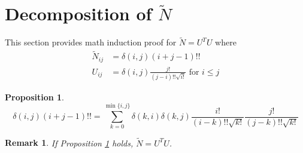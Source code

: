 \documentclass{article}
\newtheorem{remark}{Remark}
\newtheorem{proposition}{Proposition}
\begin{document}
\section{Decomposition of $\widetilde{N}$}
This section provides math induction proof for $\widetilde{N}= U^T U$ where
\begin{align}
\widetilde{N}_{ij} & = \delta(i, j) (i+j-1)!! \\
U_{ij} & = \delta(i, j) \frac{j!}{(j-i)!!\sqrt{i!}} \textrm{ for } i\leq j
\end{align}
\begin{proposition}\label{prop:UUN}
\begin{equation}
\delta(i, j) (i+j-1)!! = \sum_{k=0}^{\min\{i, j\}}
\delta(k, i) \delta(k, j) \frac{i!}{(i-k)!!\sqrt{k!}}
\frac{j!}{(j-k)!!\sqrt{k!}}
\end{equation}
\end{proposition}
\begin{remark}
If Proposition \ref{prop:UUN} holds, $\widetilde{N} = U^T U$.
\end{remark}
\end{document}
